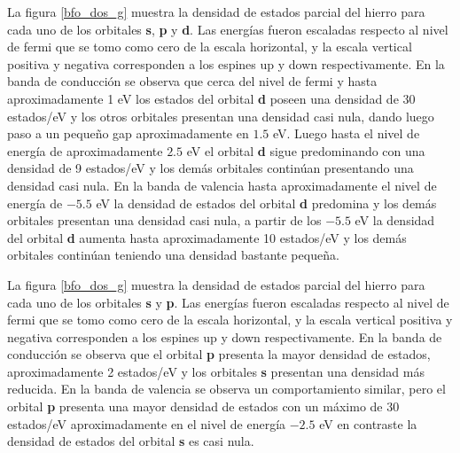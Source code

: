 
\noindent La figura \ref{bfo_dos_g}  muestra la densidad de 
estados parcial del 
hierro para cada uno de los orbitales \textbf{s}, \textbf{p} y 
\textbf{d}. 
Las 
energ\'ias fueron escaladas respecto al 
nivel de fermi que se tomo como cero de la escala horizontal, y la 
escala 
vertical positiva y negativa corresponden a los espines up y down 
respectivamente. En la banda de conducci\'on se observa que cerca del 
nivel de fermi y hasta aproximadamente 1 eV los estados del orbital 
\textbf{d} poseen una densidad de 30 estados/eV y los otros orbitales 
presentan una densidad casi nula,  dando luego paso a un peque\~no gap 
aproximadamente en $1.5$ eV. Luego hasta el nivel de energ\'ia de 
aproximadamente $2.5$ eV el orbital \textbf{d} sigue predominando con 
una densidad de 9 estados/eV y los dem\'as orbitales contin\'uan 
presentando una densidad casi nula. En la banda de valencia hasta 
aproximadamente el nivel de energ\'ia de $-5.5$ eV la densidad de 
estados del orbital \textbf{d} predomina y los dem\'as orbitales 
presentan una densidad casi nula, a partir de los $-5.5$ eV la densidad 
del orbital \textbf{d} aumenta hasta aproximadamente 10 estados/eV y 
los dem\'as orbitales contin\'uan teniendo una densidad bastante 
peque\~na.


\noindent La figura \ref{bfo_dos_g}  muestra la densidad de 
estados parcial del 
hierro para cada uno de los orbitales \textbf{s} y \textbf{p}. 
Las 
energ\'ias fueron escaladas respecto al 
nivel de fermi que se tomo como cero de la escala horizontal, y la 
escala 
vertical positiva y negativa corresponden a los espines up y down 
respectivamente. En la banda de conducci\'on se observa que el orbital 
\textbf{p} presenta la mayor densidad de estados, aproximadamente 2 
estados/eV y los orbitales \textbf{s} presentan una densidad m\'as 
reducida. En la banda de valencia se observa un comportamiento 
similar, pero el orbital \textbf{p} presenta una mayor densidad de 
estados con un m\'aximo de 30 estados/eV aproximadamente en el nivel 
de energ\'ia $-2.5$ eV en contraste la densidad de estados del orbital 
\textbf{s} es casi nula.

